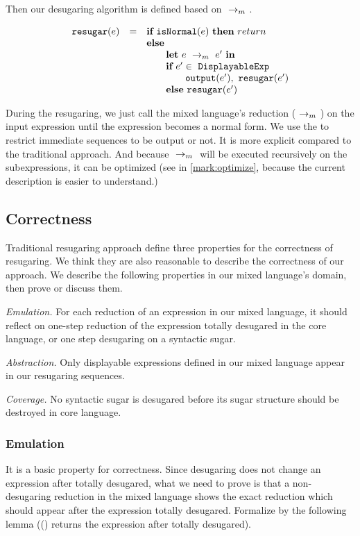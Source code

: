 
Then our desugaring algorithm is defined based on $~\rightarrow_m~$.

\[
\begin{array}{llll}
\mbox{\tt resugar} (e) &=& \mbox{\rm \bf if}~\mbox{\tt isNormal}(e)~\mbox{\rm \bf then}~return\\
              & & \mbox{\rm \bf else}~\\
							& & \qquad \mbox{\rm \bf let}~e ~\rightarrow_m~e'~\mbox{\rm \bf in}\\
							& & \qquad \mbox{\rm \bf if}~e' \in~\mbox{\tt DisplayableExp} \\
							& & \qquad \qquad \mbox{\tt output}(e'),~\mbox{\tt resugar}(e')\\
							& & \qquad \mbox{\rm \bf else}~\mbox{\tt resugar}(e')
\end{array}
\]

During the resugaring, we just call the mixed language's reduction ($~\rightarrow_m~$) on the input expression until the expression becomes a normal form. We use the  to restrict immediate sequences to be output or not. It is more explicit compared to the traditional approach. And because $~\rightarrow_m~$ will be executed recursively on the subexpressions, it can be optimized (see in \ref{mark:optimize}, because the current description is easier to understand.)

\subsection{Correctness}
\label{mark:correct}

Traditional resugaring approach\cite{resugaring,hygienic} define three properties for the correctness of resugaring. We think they are also reasonable to describe the correctness of our approach. We describe the following properties in our mixed language's domain, then prove or discuss them.

\emph{Emulation.} For each reduction of an expression in our mixed language, it should reflect on one-step reduction of the expression totally desugared in the core language, or one step desugaring on a syntactic sugar.

\emph{Abstraction.} Only displayable expressions defined in our mixed language appear in our resugaring sequences.

\emph{Coverage.} No syntactic sugar is desugared before its sugar structure should be destroyed in core language.

\subsubsection{Emulation} It is a basic property for correctness. Since desugaring does not change an expression after totally desugared, what we need to prove is that a non-desugaring reduction in the mixed language shows the exact reduction which should appear after the expression totally desugared. Formalize by the following lemma (() returns the expression after  totally desugared).

